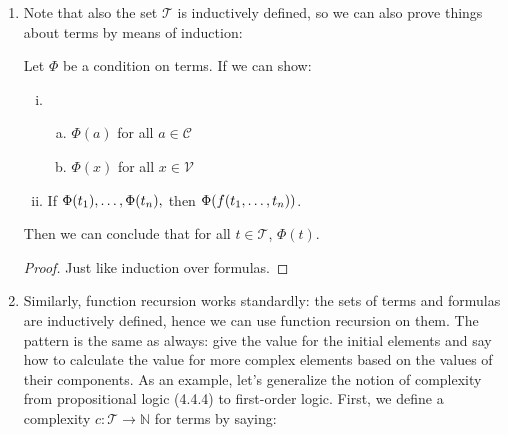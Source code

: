 \begin{enumerate}[\thesection.1]
\begin{theorem}
\begin{enumerate}[(i)]
\begin{enumerate}[(a)]
			\item For all $\phi\in\mathcal{L}$, if $\Phi(\phi)$, then $\Phi(Qx\phi)$ for $Q=\forall,\exists$.

		
		\end{enumerate}
		\end{enumerate}
		Then we can conclude that for all $\phi\in\mathcal{L}$, $\Phi(\phi)$.
		\end{theorem}
		\begin{proof}
		Completely analogous to the proof of Theorem 4.2.1 (induction in propositional logic).
		\end{proof}
		
		\item Note that also the set $\mathcal{T}$ is inductively defined, so we can also prove things about terms by means of induction:
		 \begin{theorem}
		Let $\Phi$ be a condition on terms. If we can show:
		\begin{enumerate}[(i)]
		
			\item  \begin{enumerate}[(a)]
			
				\item $\Phi(a)$ for all $a\in\mathcal{C}$
				
				\item $\Phi(x)$ for all $x\in\mathcal{V}$
			
			\end{enumerate}
			
			\item If $\Phi(t_1), \mathellipsis,\Phi(t_n),$ then $\Phi(f(t_1,\mathellipsis,t_n))$.
		\end{enumerate}
		Then we can conclude that for all $t\in\mathcal{T}$, $\Phi(t)$.
		\end{theorem}
		\begin{proof}
		Just like induction over formulas.
		\end{proof}
		
	  \item Similarly, function recursion works standardly:
		the sets of terms and formulas are inductively defined, hence we can use function recursion on them.
		The pattern is the same as always: give the value for the initial elements and say how to calculate the value for more complex elements based on the values of their components.
		As an example, let's generalize the notion of complexity from propositional logic (4.4.4) to first-order logic.
		First, we define a complexity
		$c:\mathcal{T}\to\mathbb{N}$
		for terms by saying:
	\begin{enumerate}[(i)]
	

\end{enumerate}
\end{enumerate}
